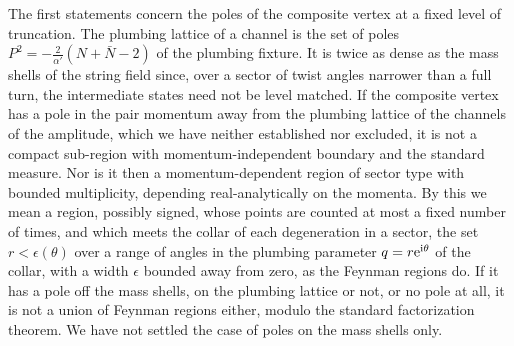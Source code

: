   The first statements concern the poles of the composite vertex at a fixed level of truncation.
The plumbing lattice of a channel is the set of poles $P^2 = - \tfrac{2}{\alpha'} (N + \bar N - 2)$ of the plumbing fixture.
  It is twice as dense as the mass shells of the string field since, over a sector of twist angles narrower than a full turn, the intermediate states need not be level matched.
If the composite vertex has a pole in the pair momentum away from the plumbing lattice of the channels of the amplitude, which we have neither established nor excluded, it is not a compact sub-region with momentum-independent boundary and the standard measure.
Nor is it then a momentum-dependent region of sector type with bounded multiplicity, depending real-analytically on the momenta.
  By this we mean a region, possibly signed, whose points are counted at most a fixed number of times, and which meets the collar of each degeneration in a sector, the set $r < \epsilon(\theta)$ over a range of angles in the plumbing parameter $q = r \mathrm{e}^{\mathrm{i} \theta}$ of the collar, with a width $\epsilon$ bounded away from zero, as the Feynman regions do.
If it has a pole off the mass shells, on the plumbing lattice or not, or no pole at all, it is not a union of Feynman regions either, modulo the standard factorization theorem.
  We have not settled the case of poles on the mass shells only.

